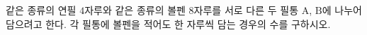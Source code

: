 같은 종류의 연필 $4$자루와 같은 종류의 볼펜 $8$자루를 서로 다른 두 필통 $\mathrm{A}$, $\mathrm{B}$에 나누어 담으려고 한다. 각 필통에 볼펜을 적어도 한 자루씩 담는 경우의 수를 구하시오. 
